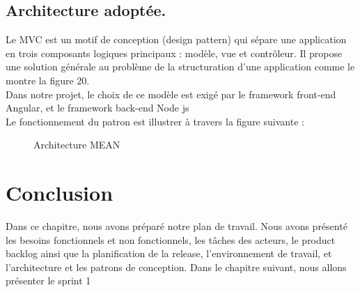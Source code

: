     \subsection{Architecture adoptée.  } 
    Le MVC est un motif de conception (design pattern) qui sépare une application en trois composants logiques principaux : modèle, vue et contrôleur. Il propose une solution générale au problème de la structuration d’une application comme le montre la figure 20. \\
    Dans notre projet, le choix de ce modèle est exigé par le framework front-end   Angular, et le framework back-end Node js \\
    Le fonctionnement du patron est illustrer à travers la figure suivante :
    \begin{figure}[H]
        \centering
        \caption{Architecture MEAN }
        \label{fig:logo_tt}
    \end{figure}
\section*{Conclusion}
Dans ce chapitre, nous avons préparé notre plan de travail. Nous avons présenté les besoins fonctionnels et non fonctionnels, les tâches des acteurs, le product backlog ainsi que la planification de la release, l'environnement de travail, et l'architecture et les patrons de conception. Dans le chapitre suivant, nous allons présenter le sprint 1 